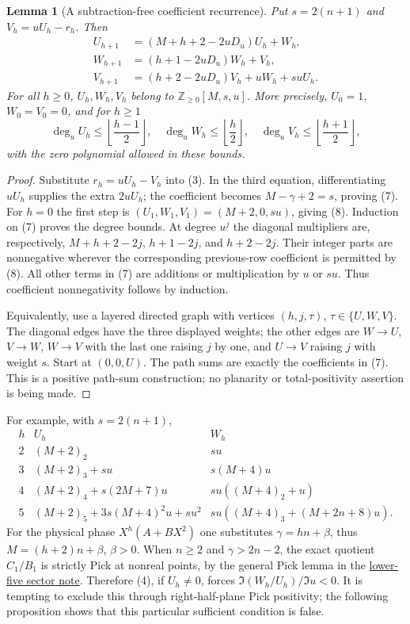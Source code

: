 \documentclass[11pt]{article}
\newtheorem{lemma}{Lemma}\newtheorem{proposition}{Proposition}
\begin{document}
\begin{lemma}[A subtraction-free coefficient recurrence]\label{lem:positive-coefficients}
Put $s=2(n+1)$ and $V_h=uU_h-r_h$.  Then
\[
\begin{split}
U_{h+1}&=(M+h+2-2uD_u)U_h+W_h,\\
W_{h+1}&=(h+1-2uD_u)W_h+V_h,\\
V_{h+1}&=(h+2-2uD_u)V_h+uW_h+suU_h.
\end{split} \tag{7}
\]
For all $h\ge0$, $U_h,W_h,V_h$ belong to
$\mathbb Z_{\ge0}[M,s,u]$.
More precisely, $U_0=1$, $W_0=V_0=0$, and for $h\ge1$
\[
\deg_u U_h\le\left\lfloor\frac{h-1}{2}\right\rfloor,\quad
\deg_u W_h\le\left\lfloor\frac h2\right\rfloor,\quad
\deg_u V_h\le\left\lfloor\frac{h+1}{2}\right\rfloor,                 \tag{8}
\]
with the zero polynomial allowed in these bounds.
\end{lemma}
\begin{proof}
Substitute $r_h=uU_h-V_h$ into (3).  In the third equation,
differentiating $uU_h$ supplies the extra $2uU_h$;
the coefficient becomes $M-\gamma+2=s$, proving (7).
For $h=0$ the first step is
$(U_1,W_1,V_1)=(M+2,0,su)$, giving (8).
Induction on (7) proves the degree bounds.
At degree $u^j$ the diagonal multipliers are, respectively,
$M+h+2-2j$, $h+1-2j$, and $h+2-2j$.
Their integer parts are nonnegative wherever the corresponding
previous-row coefficient is permitted by (8).
All other terms in (7) are additions or multiplication by $u$ or $su$.
Thus coefficient nonnegativity follows by induction.

Equivalently, use a layered directed graph with vertices $(h,j,\tau)$,
$\tau\in\{U,W,V\}$.  The diagonal edges have the three displayed
weights; the other edges are $W\to U$, $V\to W$, $W\to V$
with the last one raising $j$ by one, and $U\to V$ raising $j$
with weight $s$.  Start at $(0,0,U)$.
The path sums are exactly the coefficients in (7).
This is a positive path-sum construction; no planarity or
total-positivity assertion is being made.
\end{proof}

For example, with $s=2(n+1)$,
\[
\begin{array}{c|c|c}
h&U_h&W_h\\ \hline
2&(M+2)_2&su\\
3&(M+2)_3+su&s(M+4)u\\
4&(M+2)_4+s(2M+7)u&su((M+4)_2+u)\\
5&(M+2)_5+3s(M+4)^2u+su^2&
su((M+4)_3+(M+2n+8)u).
\end{array}
\]
For the physical phase $X^h(A+BX^2)$ one substitutes
$\gamma=hn+\beta$, thus $M=(h+2)n+\beta$, $\beta>0$.
When $n\ge2$ and $\gamma>2n-2$, the exact quotient $C_1/B_1$ is strictly
Pick at nonreal points, by the general Pick lemma in the
\href{LOWER_FIVE_QUADRATIC_SECTOR_SFC.tex}
{lower-five sector note}.  Therefore (4), if $U_h\ne0$,
forces $\Im(W_h/U_h)/\Im u<0$.  It is tempting to exclude this
through right-half-plane Pick positivity; the following proposition
shows that this particular sufficient condition is false.
\end{document}
